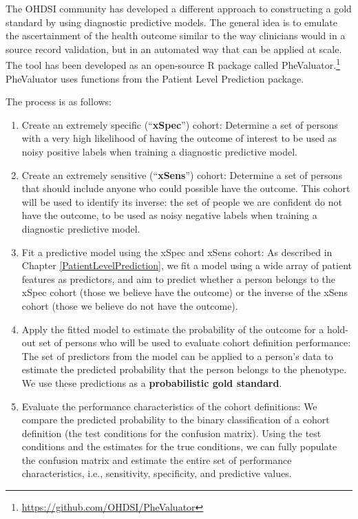 \documentclass[11pt]{book}
\providecommand{\tightlist}{%
  \setlength{\itemsep}{0pt}\setlength{\parskip}{0pt}}
\let\rmarkdownfootnote\footnote%
\def\footnote{\protect\rmarkdownfootnote}
\theoremstyle{definition}
\theoremstyle{definition}
\theoremstyle{definition}
\theoremstyle{remark}
\begin{document}
The OHDSI community has developed a different approach to constructing a
gold standard by using diagnostic predictive models.
\citep{Swerdel2019phevaluator} The general idea is to emulate the
ascertainment of the health outcome similar to the way clinicians would
in a source record validation, but in an automated way that can be
applied at scale. The tool has been developed as an open-source R
package called PheValuator.\footnote{\url{https://github.com/OHDSI/PheValuator}}
PheValuator uses functions from the Patient Level Prediction package.

The process is as follows:

\begin{enumerate}
\def\labelenumi{\arabic{enumi}.}
\tightlist
\item
  Create an extremely specific (``\textbf{xSpec}'') cohort: Determine a
  set of persons with a very high likelihood of having the outcome of
  interest to be used as noisy positive labels when training a
  diagnostic predictive model.
\item
  Create an extremely sensitive (``\textbf{xSens}'') cohort: Determine a
  set of persons that should include anyone who could possible have the
  outcome. This cohort will be used to identify its inverse: the set of
  people we are confident do not have the outcome, to be used as noisy
  negative labels when training a diagnostic predictive model.
\item
  Fit a predictive model using the xSpec and xSens cohort: As described
  in Chapter \ref{PatientLevelPrediction}, we fit a model using a wide
  array of patient features as predictors, and aim to predict whether a
  person belongs to the xSpec cohort (those we believe have the outcome)
  or the inverse of the xSens cohort (those we believe do not have the
  outcome).
\item
  Apply the fitted model to estimate the probability of the outcome for
  a hold-out set of persons who will be used to evaluate cohort
  definition performance: The set of predictors from the model can be
  applied to a person's data to estimate the predicted probability that
  the person belongs to the phenotype. We use these predictions as a
  \textbf{probabilistic gold standard}.
\item
  Evaluate the performance characteristics of the cohort definitions: We
  compare the predicted probability to the binary classification of a
  cohort definition (the test conditions for the confusion matrix).
  Using the test conditions and the estimates for the true conditions,
  we can fully populate the confusion matrix and estimate the entire set
  of performance characteristics, i.e., sensitivity, specificity, and
  predictive values.
\end{enumerate}
\end{document}
